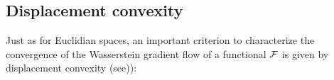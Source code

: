 



\subsection{Displacement convexity}\label{subsec:lambda_convexity}
Just as for Euclidian spaces, an  important criterion to characterize the convergence of the Wasserstein gradient flow of a functional ${{\mathcal F}}$ is given by displacement convexity (see\cite[Definition 16.5]{Villani:2004})):

